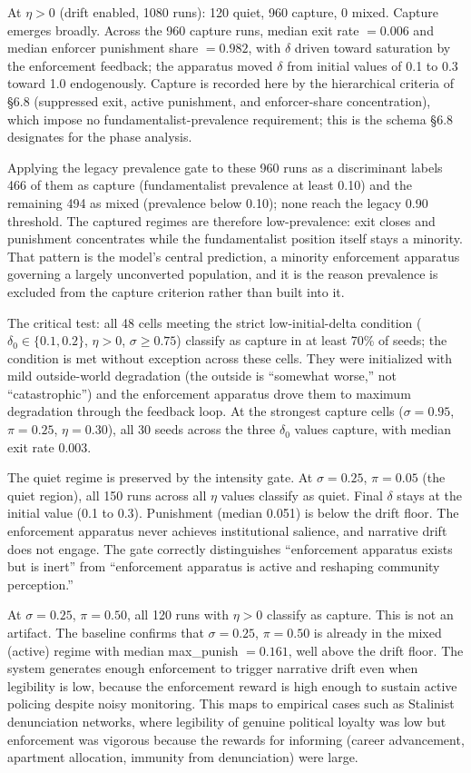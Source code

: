 \documentclass[12pt]{article}
\begin{document}
At $\eta > 0$ (drift enabled, 1080 runs): 120 quiet, 960 capture, 0 mixed. Capture emerges broadly. Across the 960 capture runs, median exit rate $= 0.006$ and median enforcer punishment share $= 0.982$, with $\delta$ driven toward saturation by the enforcement feedback; the apparatus moved $\delta$ from initial values of 0.1 to 0.3 toward 1.0 endogenously. Capture is recorded here by the hierarchical criteria of \S6.8 (suppressed exit, active punishment, and enforcer-share concentration), which impose no fundamentalist-prevalence requirement; this is the schema \S6.8 designates for the phase analysis.

Applying the legacy prevalence gate to these 960 runs as a discriminant labels 466 of them as capture (fundamentalist prevalence at least 0.10) and the remaining 494 as mixed (prevalence below 0.10); none reach the legacy 0.90 threshold. The captured regimes are therefore low-prevalence: exit closes and punishment concentrates while the fundamentalist position itself stays a minority. That pattern is the model's central prediction, a minority enforcement apparatus governing a largely unconverted population, and it is the reason prevalence is excluded from the capture criterion rather than built into it.

The critical test: all 48 cells meeting the strict low-initial-delta condition ($\delta_0 \in \{0.1, 0.2\}$, $\eta > 0$, $\sigma \geq 0.75$) classify as capture in at least 70\% of seeds; the condition is met without exception across these cells. They were initialized with mild outside-world degradation (the outside is ``somewhat worse,'' not ``catastrophic'') and the enforcement apparatus drove them to maximum degradation through the feedback loop. At the strongest capture cells ($\sigma = 0.95$, $\pi = 0.25$, $\eta = 0.30$), all 30 seeds across the three $\delta_0$ values capture, with median exit rate 0.003.

The quiet regime is preserved by the intensity gate. At $\sigma = 0.25$, $\pi = 0.05$ (the quiet region), all 150 runs across all $\eta$ values classify as quiet. Final $\delta$ stays at the initial value (0.1 to 0.3). Punishment (median 0.051) is below the drift floor. The enforcement apparatus never achieves institutional salience, and narrative drift does not engage. The gate correctly distinguishes ``enforcement apparatus exists but is inert'' from ``enforcement apparatus is active and reshaping community perception.''

At $\sigma = 0.25$, $\pi = 0.50$, all 120 runs with $\eta > 0$ classify as capture. This is not an artifact. The baseline confirms that $\sigma = 0.25$, $\pi = 0.50$ is already in the mixed (active) regime with median max\_punish $= 0.161$, well above the drift floor. The system generates enough enforcement to trigger narrative drift even when legibility is low, because the enforcement reward is high enough to sustain active policing despite noisy monitoring. This maps to empirical cases such as Stalinist denunciation networks, where legibility of genuine political loyalty was low but enforcement was vigorous because the rewards for informing (career advancement, apartment allocation, immunity from denunciation) were large.
\end{document}

